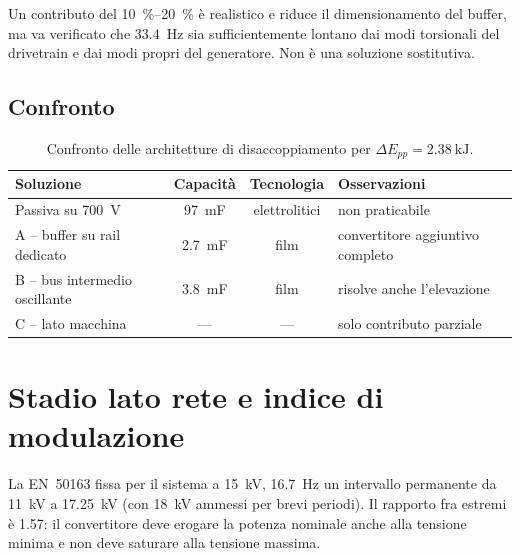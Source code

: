 \documentclass[11pt,a4paper]{article}
\begin{document}
Un contributo del \SI{10}{\percent}--\SI{20}{\percent} è realistico e riduce il
dimensionamento del buffer, ma va verificato che \SI{33.4}{\hertz} sia sufficientemente
lontano dai modi torsionali del drivetrain e dai modi propri del generatore. Non è una
soluzione sostitutiva.

\subsection{Confronto}

\begin{table}[h]
\centering
\begin{tabular}{lccl}
\toprule
Soluzione & Capacità & Tecnologia & Osservazioni \\
\midrule
Passiva su \SI{700}{\volt}      & \SI{97}{\milli\farad} & elettrolitici & non praticabile \\
A -- buffer su rail dedicato     & \SI{2.7}{\milli\farad} & film & convertitore aggiuntivo completo \\
B -- bus intermedio oscillante   & \SI{3.8}{\milli\farad} & film & risolve anche l'elevazione \\
C -- lato macchina               & ---                    & ---  & solo contributo parziale \\
\bottomrule
\end{tabular}
\caption{Confronto delle architetture di disaccoppiamento per $\Delta E_{pp}=\SI{2.38}{\kilo\joule}$.}
\end{table}

\section{Stadio lato rete e indice di modulazione}
\label{sec:modulazione}

La EN~50163 \cite{en50163} fissa per il sistema a \SI{15}{\kilo\volt},
\SI{16.7}{\hertz} un intervallo permanente da \SI{11}{\kilo\volt} a
\SI{17.25}{\kilo\volt} (con \SI{18}{\kilo\volt} ammessi per brevi periodi). Il rapporto
fra estremi è \num{1.57}: il convertitore deve erogare la potenza nominale anche alla
tensione minima e non deve saturare alla tensione massima.
\end{document}
